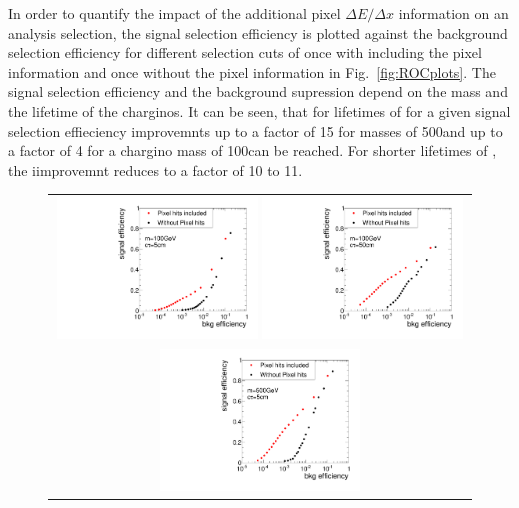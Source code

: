 In order to quantify the impact of the additional pixel $\Delta E/\Delta x$ information on an analysis selection, the signal selection efficiency is plotted against the background selection efficiency for different selection cuts of \ias once with including the pixel information and once without the pixel information in Fig.~\ref{fig:ROCplots}.
The signal selection efficiency and the background supression depend on the mass and the lifetime of the charginos.
It can be seen, that for lifetimes of \cm  for a given signal selection effieciency improvemnts up to a factor of 15 for masses of 500\gev and up to a factor of 4 for a chargino mass of 100\gev can be reached.
For shorter lifetimes of \cm, the iimprovemnt reduces to a factor of 10 to 11.
\begin{figure}[!bt]
  \centering 
  \begin{tabular}{c}
    \includegraphics[width=0.49\textwidth]{figures/analysis/rocplot_wjets_mass_100GeV_ctau_5cm.pdf} 
    \includegraphics[width=0.49\textwidth]{figures/analysis/rocplot_wjets_mass_100GeV_ctau_50cm.pdf} \\
    \includegraphics[width=0.49\textwidth]{figures/analysis/rocplot_wjets_mass_500GeV_ctau_5cm.pdf} 

\end{tabular}
\end{figure}
